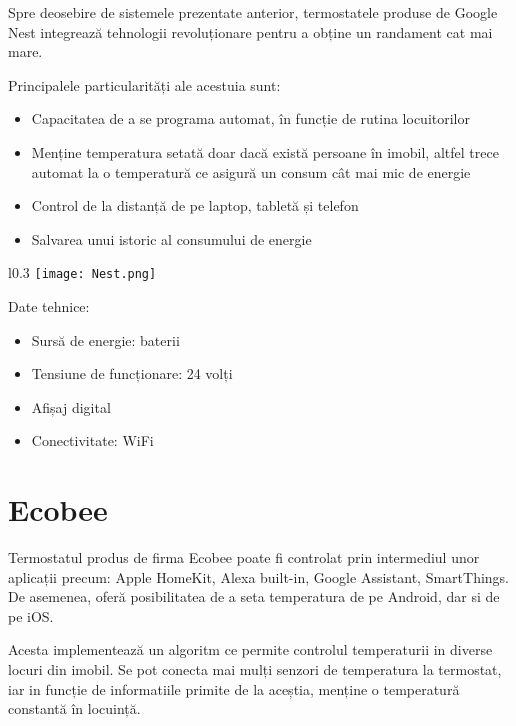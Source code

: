 	Spre deosebire de sistemele prezentate anterior, termostatele produse de Google Nest integrează tehnologii revoluționare pentru a obține un randament cat mai mare.

\vspace{2em}

	Principalele particularități ale acestuia sunt:
	\begin{itemize}
	\setlength{\itemindent}{2em}
		\item Capacitatea de a se programa automat, în funcție de rutina locuitorilor
		\item Menține temperatura setată doar dacă există persoane în imobil, altfel trece automat la o temperatură ce asigură un consum cât mai mic de energie
		\item Control de la distanță de pe laptop, tabletă și telefon
		\item Salvarea unui istoric al consumului de energie
	\end{itemize}

\vspace{2em}

\begin{wrapfigure}{l}{0.3\textwidth} 
\centering
\texttt{[image: Nest.png]}
\end{wrapfigure}

	Date tehnice:
	\begin{itemize}
	\setlength{\itemindent}{2em}
		\item Sursă de energie: baterii
		\item Tensiune de funcționare: 24 volți
		\item Afișaj digital
		\item Conectivitate: WiFi
	\end{itemize}

\section{Ecobee}
	 Termostatul produs de firma Ecobee poate fi controlat prin intermediul unor aplicații precum: Apple HomeKit, Alexa built-in, Google Assistant, SmartThings. De asemenea, oferă posibilitatea de a seta temperatura de pe Android, dar si de pe iOS.
	
	Acesta implementează un algoritm ce permite controlul temperaturii in diverse locuri din imobil. Se pot conecta mai mulți senzori de temperatura la termostat, iar in funcție de informatiile primite de la aceștia, menține o temperatură constantă în locuință.

